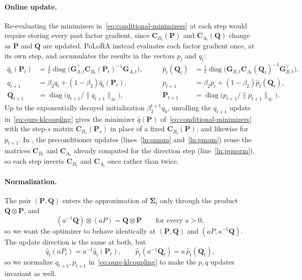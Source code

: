 \documentclass[11pt]{article}
\newcommand{\mat}[1]{\bm{#1}}
\DeclareMathOperator{\diag}{diag}
\newcommand{\norm}[1]{\| #1\|}
\newcommand{\methodname}{PoLoRA\xspace}
\begin{document}
\paragraph{Online update.} Re-evaluating the minimizers
in~\eqref{eq:conditional-minimizers} at each step would require
storing every past factor gradient, since $\mat{C}_{B_t}(\mat{P})$ and $\mat{C}_{A_t}(\mat{Q})$ change
as $\mat{P}$ and $\mat{Q}$ are updated. \methodname{} instead evaluates each factor
gradient once, at its own step, and accumulates the results in the vectors
$p_t$ and $q_t$:
\begin{equation}\label{eq:ours-klcoupling}
\begin{alignedat}{2}
  \hat{q}_t(\mat{P}_t)
    &= \frac1r\diag\bigl(\mat{G}_{A,t}^\top \mat{C}_{B_t}(\mat{P}_t)^{-1}\mat{G}_{A,t}\bigr),
  &\qquad
  \hat{p}_t(\mat{Q}_t)
    &= \frac1r\diag\bigl(\mat{G}_{B,t} \mat{C}_{A_t}(\mat{Q}_t)^{-1}\mat{G}_{B,t}^\top\bigr),
  \\
  q_{t+1}
    &= \beta_2q_t+(1-\beta_2)\hat{q}_t(\mat{P}_t),
  &\qquad
  p_{t+1}
    &= \beta_2p_t+(1-\beta_2)\hat{p}_t(\mat{Q}_t),
  \\
  \mat{Q}_{t+1}
    &= \diag\bigl(q_{t+1}/\norm{q_{t+1}}_\infty\bigr),
  &\qquad
  \mat{P}_{t+1}
    &= \diag\bigl(p_{t+1}/\norm{p_{t+1}}_\infty\bigr).
\end{alignedat}
\end{equation}
Up to the exponentially decayed initialization $\beta_2^{t+1}q_0$, unrolling the
$q_{t+1}$ update in~\eqref{eq:ours-klcoupling} gives the
minimizer $\hat q(\mat{P})$ of~\eqref{eq:conditional-minimizers} with the
step-$s$ matrix $\mat{C}_{B_s}(\mat{P}_s)$ in place of a fixed $\mat{C}_{B_t}(\mat{P})$, and likewise for $p_{t+1}$. In , the preconditioner updates (lines~\ref{ln:qmom}
and~\ref{ln:pmom}) reuse the matrices $\mat{C}_{B_t}$ and $\mat{C}_{A_t}$ already computed for the direction step (line~\ref{ln:pqnorm}), so each step inverts $\mat{C}_{B_t}$ and $\mat{C}_{A_t}$ once rather than twice.

\paragraph{Normalization.} The pair $(\mat{P}, \mat{Q})$ enters the
approximation of $\overline{\mat{\Sigma}}_t$ only through the product
$\mat{Q} \otimes \mat{P}$, and
\[
  (a^{-1}\mat{Q})\otimes(aP)=\mat{Q}\otimes \mat{P}
  \qquad\text{for every } a>0,
\]
so we want the optimizer to behave identically at $(\mat{P},\mat{Q})$ and
$(aP,a^{-1}\mat{Q})$. The update direction is the same at both, but
\[
  \hat q_t(aP_t)=a^{-1}\hat q_t(\mat{P}_t),
  \qquad
  \hat p_t(a^{-1}\mat{Q}_t)=a\,\hat p_t(\mat{Q}_t),
\]
so we normalize $q_{t+1},p_{t+1}$ in~\eqref{eq:ours-klcoupling} to
make the $p,q$ updates invariant as well.
\end{document}

